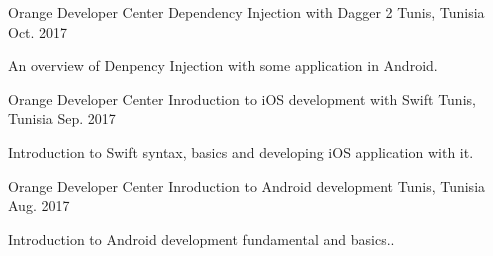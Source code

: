 

\begin{cventries}
	
	\cventry
		{Orange Developer Center} %
		{Dependency Injection with Dagger 2} %
		{Tunis, Tunisia} %
		{Oct. 2017} %
		{
			\begin{cvitems} %
				\item {An overview of Denpency Injection with some application in Android.}
			\end{cvitems}
		}

  \cventry
    {Orange Developer Center} %
    {Inroduction to iOS development with Swift} %
    {Tunis, Tunisia} %
    {Sep. 2017} %
    {
      \begin{cvitems} %
        \item {Introduction to Swift syntax, basics and developing iOS application with it.}
      \end{cvitems}
    }
	
	\cventry
		{Orange Developer Center} %
		{Inroduction to Android development} %
		{Tunis, Tunisia} %
		{Aug. 2017} %
		{
			\begin{cvitems} %
				\item {Introduction to Android development fundamental and basics..}
			\end{cvitems}
		}

\end{cventries}
